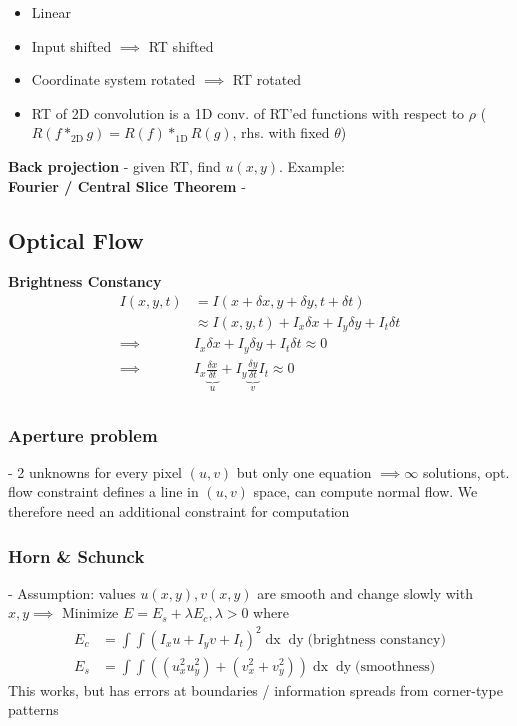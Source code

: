 \documentclass[a4paper,10pt]{article}
\begin{document}
\begin{itemize}
    \item Linear
    \item Input shifted \( \implies \) RT shifted
    \item Coordinate system rotated \( \implies \) RT rotated
    \item RT of 2D convolution is a 1D conv. of RT'ed functions with respect to \( \rho \) (\( R(f*_\text{2D} g) = R(f) *_\text{1D} R(g) \), rhs. with fixed \( \theta  \))
\end{itemize}
\textbf{Back projection} - given RT, find \( u(x,y) \). Example: \\ %
\textbf{Fourier / Central Slice Theorem} - %

\subsection{Optical Flow}
\textbf{Brightness Constancy}
\begin{align*}
    I(x,y,t) &= I(x+ \delta x, y + \delta y, t + \delta t) \\
	     &\approx I(x,y,t) + I_x \delta x + I_y \delta y + I_t \delta t \\
    \implies &I_x \delta x + I_y \delta y + I_t \delta t \approx 0 \\
    \implies &I_x \underbrace{\frac{\delta x}{\delta t}}_u + I_y \underbrace{\frac{\delta y}{\delta t}}_v I_t \approx 0 \\
\end{align*}
\subsubsection{Aperture problem} - 2 unknowns for every pixel \( (u,v) \) but only one equation \( \implies \infty\)  solutions, opt. flow constraint defines a line in \( (u,v) \) space, can compute normal flow. We therefore need an additional constraint for computation
\subsubsection{Horn \& Schunck} - Assumption: values \( u(x,y), v(x,y) \) are smooth and change slowly with \( x,y \implies \) Minimize \( E = E_s + \lambda E_c, \lambda > 0 \) where 
    \begin{align*}
	E_c &= \int \int (I_x u + I_y v + I_t)^2 \mathop{dx} \mathop{dy} \text{(brightness constancy)} \\ 
	E_s &= \int \int ((u^2_x u^2_y) + (v^2_x + v^2_y)) \mathop{dx} \mathop{dy} \text{(smoothness)}
    \end{align*}
This works, but has errors at boundaries / information spreads from corner-type patterns
\end{document}
